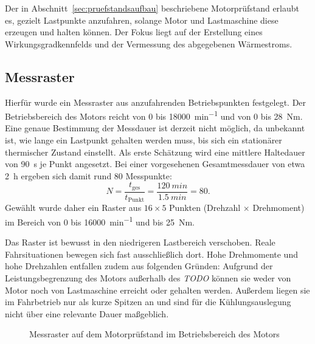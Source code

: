 Der in Abschnitt~\ref{sec:pruefstandsaufbau} beschriebene Motorprüfstand
erlaubt es, gezielt Lastpunkte anzufahren, solange Motor und Lastmaschine
diese erzeugen und halten können. Der Fokus liegt auf der Erstellung eines
Wirkungsgradkennfelds und der Vermessung des abgegebenen Wärmestroms.

\subsection{Messraster}

Hierfür wurde ein Messraster aus anzufahrenden Betriebspunkten festgelegt.
Der Betriebsbereich des Motors reicht von \SI{0}{} bis
\SI{18000}{min^{-1}} und von \SI{0}{} bis \SI{28}{Nm}. Eine genaue
Bestimmung der Messdauer ist derzeit nicht möglich, da unbekannt ist, wie
lange ein Lastpunkt gehalten werden muss, bis sich ein stationärer thermischer
Zustand einstellt. Als erste Schätzung wird eine mittlere Haltedauer von
\SI{90}{s} je Punkt angesetzt. Bei einer vorgesehenen Gesamtmessdauer von
etwa \SI{2}{h} ergeben sich damit rund 80 Messpunkte:
\begin{equation}
    N = \frac{t_\mathrm{ges}}{t_\mathrm{Punkt}}
      = \frac{\SI{120}{min}}{\SI{1.5}{min}} = 80 .
\end{equation}
Gewählt wurde daher ein Raster aus $16 \times 5$ Punkten (Drehzahl $\times$
Drehmoment) im Bereich von \SI{0}{} bis \SI{16000}{min^{-1}} und bis
\SI{25}{Nm}.

Das Raster ist bewusst in den niedrigeren Lastbereich verschoben. Reale
Fahrsituationen bewegen sich fast ausschließlich dort. Hohe Drehmomente
und hohe Drehzahlen entfallen zudem aus folgenden Gründen: Aufgrund der
Leistungsbegrenzung des Motors außerhalb des \textit{TODO} können sie weder
von Motor noch von Lastmaschine erreicht oder gehalten werden. Außerdem
liegen sie im Fahrbetrieb nur als kurze Spitzen an und sind für die
Kühlungsauslegung nicht über eine relevante Dauer maßgeblich.

\begin{figure}[htbp]
    \centering
    \caption{Messraster auf dem Motorprüfstand im Betriebsbereich des Motors}
    \label{fig:messraster}
\end{figure}

